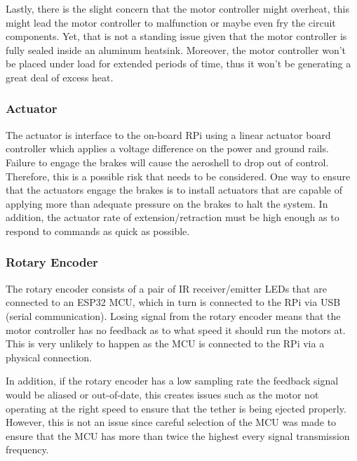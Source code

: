 Lastly, there is the slight concern that the motor controller might overheat, this might lead the motor controller to malfunction or maybe even fry the circuit components. Yet, that is not a standing issue given that the motor controller is fully sealed inside an aluminum heatsink. Moreover, the motor controller won't be placed under load for extended periods of time, thus it won't be generating a great deal of excess heat.

\subsubsection*{Actuator}

\indent\indent The actuator is interface to the on-board RPi using a linear actuator board controller which applies a voltage difference on the power and ground rails. Failure to engage the brakes will cause the aeroshell to drop out of control. Therefore, this is a possible risk that needs to be considered. One way to ensure that the actuators engage the brakes is to install actuators that are capable of applying more than adequate pressure on the brakes to halt the system. In addition, the actuator rate of extension/retraction must be high enough as to respond to commands as quick as possible.

\subsubsection*{Rotary Encoder}

\indent\indent The rotary encoder consists of a pair of IR receiver/emitter LEDs that are connected to an ESP32 MCU, which in turn is connected to the RPi via USB (serial communication). Losing signal from the rotary encoder means that the motor controller has no feedback as to what speed it should run the motors at. This is very unlikely to happen as the MCU is connected to the RPi via a physical connection.

In addition, if the rotary encoder has a low sampling rate the feedback signal would be aliased or out-of-date, this creates issues such as the motor not operating at the right speed to ensure that the tether is being ejected properly. However, this is not an issue since careful selection of the MCU was made to ensure that the MCU has more than twice the highest every signal transmission frequency.
